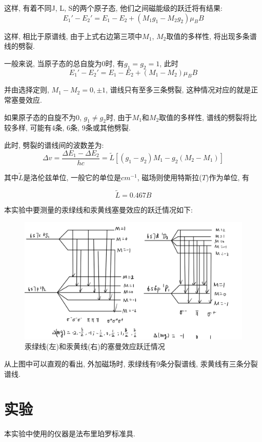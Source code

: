 \documentclass[12pt,a4paper]{article}
\newcommand{\be}[1]{
    \begin{equation}
        #1
    \end{equation}
}
\begin{document}
这样, 有着不同J, L, S的两个原子态, 他们之间磁能级的跃迁将有结果: 
\begin{equation}
    E_1'-E_2'=E_1-E_2+(M_1 g_1-M_2 g_2)\mu_{B}B
\end{equation}

这样, 相比于原谱线, 由于上式右边第三项中$M_1$, $M_2$取值的多样性, 将出现多条谱线的劈裂. 

一般来说, 当原子态的总自旋为0时, 有$g_1=g_2=1$, 此时
\begin{equation}
    E_1'-E_2'=E_1-E_2+(M_1-M_2)\mu_{B}B
\end{equation}

并由选择定则, $M_1-M_2=0,\pm 1$, 谱线只有至多三条劈裂, 这种情况对应的就是正常塞曼效应. 

如果原子态的自旋不为0, $g_1\neq g_2$时, 由于$M_1$和$M_2$取值的多样性, 谱线的劈裂将比较多样, 可能有4条, 6条, 9条或其他劈裂. 

此时, 劈裂的谱线间的波数差为: 
\begin{equation}
    \Delta v=\frac{\Delta E_{1}-\Delta E_{2}}{h c}=\widetilde{L}\left[\left(g_{1}-g_{2}\right) M_{1}-g_{2}\left(M_{2}-M_{1}\right)\right]
\end{equation}

其中$\widetilde{L}$是洛伦兹单位, 一般它的单位是$cm^{-1}$, 磁场则使用特斯拉($T$)作为单位, 有

\be{\widetilde{L}=0.467B}

本实验中要测量的汞绿线和汞黄线塞曼效应的跃迁情况如下: 
\begin{figure}[H]
\centering
\includegraphics[width=\textwidth]{跃迁图.jpg}
\caption{汞绿线(左)和汞黄线(右)的塞曼效应跃迁情况}
\end{figure}

从上图中可以直观的看出, 外加磁场时, 汞绿线有9条分裂谱线, 汞黄线有三条分裂谱线. 
\section{实验}
本实验中使用的仪器是法布里珀罗标准具. 
\end{document}
